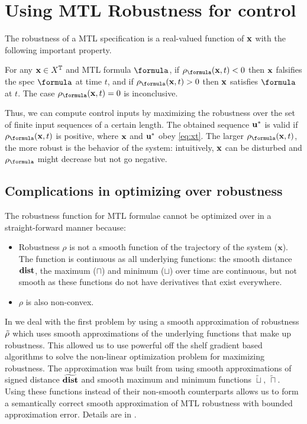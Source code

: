 \section{Using MTL Robustness for control}
\label{sec:MTL_control}
The robustness of a MTL specification is a real-valued function of $\mathbf{x}$ with the following important property.
\begin{theorem} \cite{FainekosP09tcs}
	\label{thm:rob objective}
	For any $\mathbf{x} \in X^{\mathbb{T}}$ and MTL formula $\formula$, 
	if $\robf(\sstraj,t) <0$ then $\mathbf{x}$ falsifies the spec $\formula$ at time $t$, and if $\robf(\sstraj,t) > 0$ then $\mathbf{x}$ satisfies $\formula$ at $t$. 
	The case $\robf(\sstraj,t) =0$ is inconclusive.
\end{theorem} 

Thus, we can compute control inputs by maximizing the robustness over the set of finite input sequences of a certain length.
The obtained sequence $\mathbf{u}^*$ is valid if $\robf(\sstraj,t)$ is positive, where $\mathbf{x}$ and $\mathbf{u}^*$ obey \eqref{eq:xt}.
The larger $\robf(\sstraj,t)$, the more robust is the behavior of the system: intuitively, $\mathbf{x}$ can be disturbed and $\robf$ might decrease but not go negative.

\subsection{Complications in optimizing over robustness}
The robustness function for MTL formulae cannot be optimized over in a straight-forward manner because:
\begin{itemize}
\item Robustness $\rho$ is not a smooth function of the trajectory of the system ($\mathbf{x}$). The function is continuous as all underlying functions: the smooth distance $\mathbf{dist}$, the maximum ($\sqcap$) and minimum ($\sqcup$) over time are continuous, but not smooth as these functions do not have derivatives that exist everywhere. 
\item $\rho$ is also non-convex.
\end{itemize}

In \cite{PantAM17_SmoothOpTechRpt} we deal with the first problem by using a smooth approximation of robustness $\tilde{\rho}$ which uses smooth approximations of the underlying functions that make up robustness. This allowed us to use powerful off the shelf gradient based algorithms to solve the non-linear optimization problem for maximizing robustness. The approximation was built from using smooth approximations of signed distance $\widetilde{\mathbf{dist}}$ and smooth maximum and minimum functions $\widetilde{\sqcup},\,\widetilde{\sqcap}$. Using these functions instead of their non-smooth counterparts allows us to form a semantically correct smooth approximation of MTL robustness with bounded approximation error. Details are in \cite{PantAM17_SmoothOpTechRpt}. 

